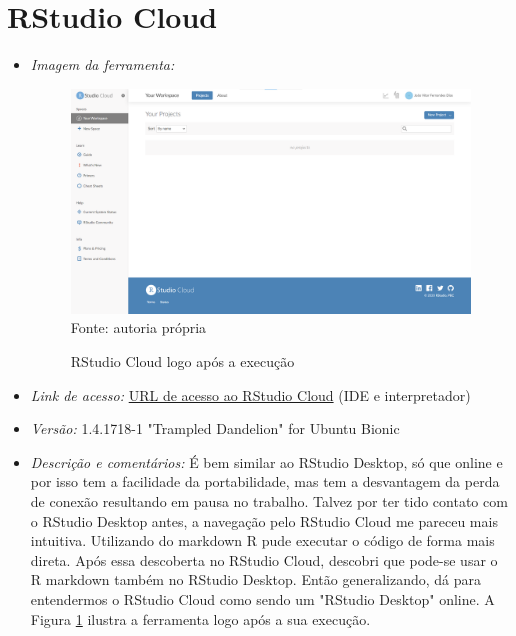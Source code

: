   \section{RStudio Cloud}
      \begin{itemize}
      	
      	\item \textit{Imagem da ferramenta:}
      	
      	\begin{figure}[H]  \label{RStudio_Cloud}
      		\centering
      		\caption{RStudio Cloud logo após a execução}
      		\includegraphics[width=16cm]{PicturesJoaoDias/Ferramentas/RStudio Cloud/RStudio_Cloud_Tela-Inicial.png}
      		{\tiny \sf Fonte: autoria própria}
      	\end{figure}
      	
          \item \textit{Link de acesso:} \href{https://rstudio.cloud/}{URL de acesso ao RStudio Cloud} (IDE e interpretador)
          \item \textit{Versão:} 1.4.1718-1 "Trampled Dandelion" for Ubuntu Bionic

          \item \textit{Descrição e comentários:}
          É bem similar ao RStudio Desktop, só que online e por isso tem a facilidade da portabilidade, mas tem a desvantagem da perda de conexão resultando em pausa no trabalho. Talvez por ter tido contato com o RStudio Desktop antes, a navegação pelo RStudio Cloud me pareceu mais intuitiva. Utilizando do markdown R pude executar o código de forma mais direta. Após essa descoberta no RStudio Cloud, descobri que pode-se usar o R markdown também no RStudio Desktop. Então generalizando, dá para entendermos o RStudio Cloud como sendo um "RStudio Desktop" online. A Figura \ref{RStudio_Cloud} ilustra a ferramenta logo após a sua execução.
      \end{itemize}

